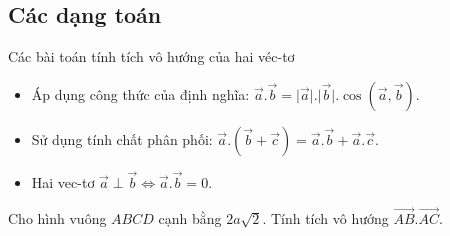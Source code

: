 \subsection{Các dạng toán}
\begin{dang}{Các bài toán tính tích vô hướng của hai véc-tơ}
	\begin{itemize}
		\item Áp dụng công thức của định nghĩa: $\vec{a}.\vec{b}=\big|\vec{a}\big|.\big|\vec{b}\big|.\cos\left(\vec{a},\vec{b}\right).$
		\item Sử dụng tính chất phân phối: $\vec{a}.\left(\vec{b}+\vec{c}\right)=\vec{a}.\vec{b}+\vec{a}.\vec{c}.$
		\item Hai vec-tơ $\vec{a}\perp \vec{b}\Leftrightarrow \vec{a}.\vec{b}=0.$
	\end{itemize}
\end{dang}
\begin{vd}%
	Cho hình vuông $ABCD$ cạnh bằng $2a\sqrt{2}$. Tính tích vô hướng $\vec{AB}.\vec{AC}.$
\end{vd}
